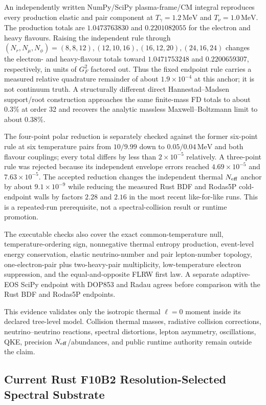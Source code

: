 An independently written NumPy/SciPy plasma-frame/CM integral reproduces every
production elastic and pair component at $T_\gamma=1.2\,\mathrm{MeV}$ and
$T_\nu=1.0\,\mathrm{MeV}$.  The production totals are $1.0473763830$ and
$0.2201082055$ for the electron and heavy flavours.  Raising the independent rule through
$(N_r,N_\mu,N_\phi)=(8,8,12),(12,10,16),(16,12,20),(24,16,24)$ changes the
electron- and heavy-flavour totals toward $1.0471753248$ and $0.2200659307$,
respectively, in units of $G_F^2$ factored out.  Thus the fixed endpoint rule carries a measured relative quadrature
remainder of about $1.9\times10^{-4}$ at this anchor; it is not continuum
truth.  A structurally different direct Hannestad--Madsen support/root
construction approaches the same finite-mass FD totals to about $0.3\%$ at
order 32 and recovers the analytic massless Maxwell--Boltzmann limit to about
$0.38\%$.

The four-point polar reduction is separately checked against the former
six-point rule at six temperature pairs from $10/9.99$ down to
$0.05/0.04\,\mathrm{MeV}$ and both flavour couplings; every total differs by
less than $2\times10^{-5}$ relatively.  A three-point rule was rejected
because its independent envelope errors reached $4.69\times10^{-5}$ and
$7.63\times10^{-5}$.  The accepted reduction changes the independent thermal
$N_{\rm eff}$ anchor by about $9.1\times10^{-9}$ while reducing the measured Rust
BDF and Rodas5P cold-endpoint walls by factors $2.28$ and $2.16$ in the
most recent like-for-like runs.  This is a repeated-run prerequisite, not a
spectral-collision result or runtime promotion.

The executable checks also cover the exact common-temperature null,
temperature-ordering sign, nonnegative thermal entropy production, event-level
energy conservation, elastic neutrino-number and pair lepton-number topology,
one-electron-pair plus two-heavy-pair multiplicity, low-temperature electron
suppression, and the equal-and-opposite FLRW first law.  A separate adaptive-
EOS SciPy endpoint with DOP853 and Radau agrees before comparison with the Rust
BDF and Rodas5P endpoints.

This evidence validates only the isotropic thermal $\ell=0$ moment inside its
declared tree-level model.  Collision thermal masses, radiative collision
corrections, neutrino--neutrino reactions, spectral distortions, lepton
asymmetry, oscillations, QKE, precision $N_{\rm eff}$/abundances, and public runtime
authority remain outside the claim.

\subsection{Current Rust F10B2 Resolution-Selected Spectral Substrate}

